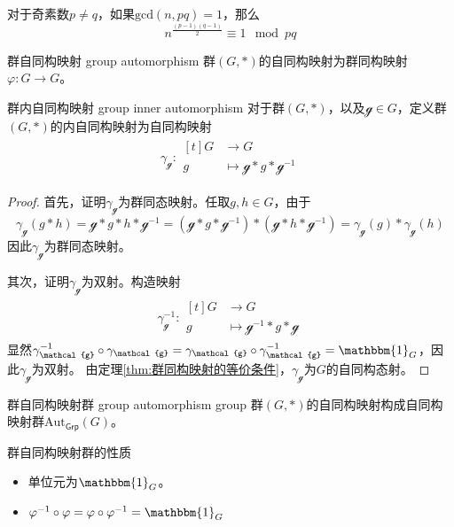 \begin{corollary}
	对于奇素数$p\ne q$，如果$\text{gcd}(n,pq)=1$，那么
	\[ 
	n^{\frac{(p-1)(q-1)}{2}}\equiv 1\mod pq
	 \]
\end{corollary}

\begin{definition}{群自同构映射 group automorphism}
	群$(G,*)$的自同构映射为群同构映射$\varphi:G\to G$。
\end{definition}

\begin{definition}{群内自同构映射 group inner automorphism}
	对于群$(G,*)$，以及$\mathcal{g}\in G$，定义群$(G,*)$的内自同构映射为自同构映射
	\begin{align*}
		\gamma_\mathcal{g}:
		\begin{aligned}[t]
			G&\longrightarrow G\\
			g&\longmapsto \mathcal{g}*g*\mathcal{g}^{-1}
		\end{aligned}
	\end{align*}
\end{definition}

\begin{proof}
	首先，证明$\gamma_\mathcal{g}$为群同态映射。任取$g,h\in G$，由于
	\[ 
	\gamma_\mathcal{g}(g*h)=\mathcal{g}*g*h*\mathcal{g}^{-1}=(\mathcal{g}*g*\mathcal{g}^{-1})*(\mathcal{g}*h*\mathcal{g}^{-1})=\gamma_\mathcal{g}(g)*\gamma_\mathcal{g}(h)
	 \]
	 因此$\gamma_\mathcal{g}$为群同态映射。
	 
	 其次，证明$\gamma_\mathcal{g}$为双射。构造映射
	 \begin{align*}
	 	\gamma_\mathcal{g}^{-1}:
	 	\begin{aligned}[t]
	 		G&\longrightarrow G\\
	 		g&\longmapsto \mathcal{g}^{-1}*g*\mathcal{g}
	 	\end{aligned}
 	\end{align*}
	 显然$\gamma_\mathcal{g}^{-1}\circ \gamma_\mathcal{g}=\gamma_\mathcal{g}\circ \gamma_\mathcal{g}^{-1}=\mathbbm{1}_G$，因此$\gamma_\mathcal{g}$为双射。
	 由定理\ref{thm:群同构映射的等价条件}，$\gamma_\mathcal{g}$为$G$的自同构态射。
\end{proof}

\begin{definition}{群自同构映射群 group automorphism group}
	群$(G,*)$的自同构映射构成自同构映射群$\mathrm{Aut}_{\mathsf{Grp}}(G)$。
\end{definition}

\begin{proposition}{群自同构映射群的性质}
	\begin{itemize}
		\item 单位元为$\mathbbm{1}_G$。
		\item $\varphi^{-1}\circ \varphi=\varphi\circ\varphi^{-1}=\mathbbm{1}_G$
	\end{itemize}
\end{proposition}

